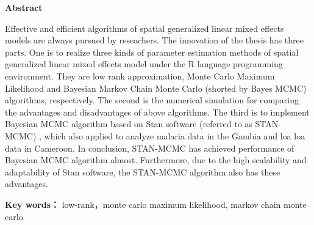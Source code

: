 \begin{center}
{\bf \Large Abstract}\\
\vskip 0.6cm
\end{center}
\par
Effective and efficient algorithms of spatial generalized linear mixed effects models are always pursued by reseachers. The innovation of the thesis has three parts. One is to realize three kinds of parameter estimation methods of spatial generalized linear mixed effects model under the R language programming environment. They are low rank approximation, Monte Carlo Maximum Likelihood and Bayesian Markov Chain Monte Carlo (shorted by Bayes MCMC) algorithms, respectively. The second is the numerical simulation for comparing the advantages and disadvantages of above algorithms. The third is to implement Bayesian MCMC algorithm based on Stan software (referred to as STAN-MCMC) , which also applied to analyze malaria data in the Gambia and loa loa data in Cameroon. In conclusion, STAN-MCMC has achieved performance of Bayesian MCMC algorithm almost. Furthermore, due to the high scalability and adaptability of Stan software, the STAN-MCMC algorithm also has these advantages.

\medskip
\par

{\bf Key words：} low-rank，monte carlo maximum likelihood, markov chain monte carlo

\newpage 
\mbox{} 

